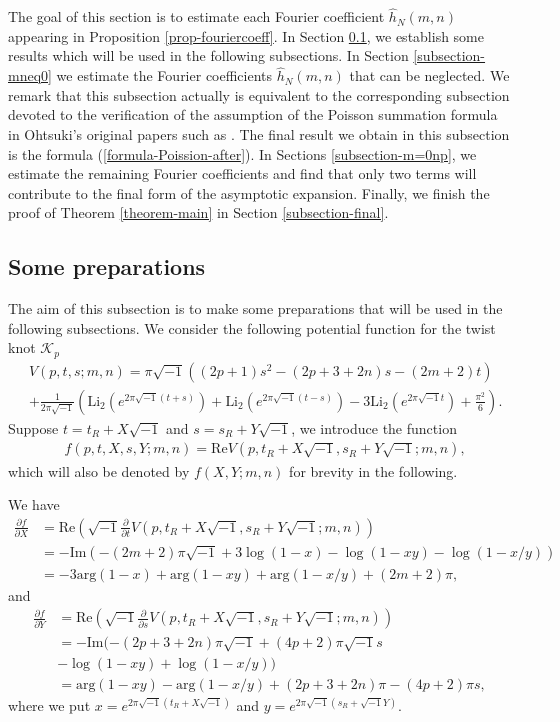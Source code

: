 \documentclass[12pt]{amsart}
\begin{document}
 
The goal of this section is to estimate each Fourier coefficient $\hat{h}_N(m,n)$ appearing in Proposition \ref{prop-fouriercoeff}. In Section \ref{subsection-preparation}, we establish some results which will be used in the following subsections.  In Section \ref{subsection-mneq0} 
we estimate the Fourier coefficients $\hat{h}_N(m,n)$ that can be neglected. We remark that this subsection actually is equivalent to the corresponding subsection devoted to the verification of the assumption of the Poisson summation formula in Ohtsuki's original papers such as \cite{Oht16,Oht18}. The final result we obtain in this subsection is the formula (\ref{formula-Poission-after}). In Sections \ref{subsection-m=0np}, we estimate the remaining Fourier coefficients and find that only two terms will contribute to the final form of the asymptotic expansion. Finally, we finish the proof of Theorem \ref{theorem-main} in Section \ref{subsection-final}.

\subsection{Some preparations} \label{subsection-preparation}
The aim of this subsection is to make some preparations that will be used in the following subsections.  
We consider the following potential function for the twist knot $\mathcal{K}_p$
\begin{align}
    &V(p,t,s; m,n)=\pi \sqrt{-1}\left((2p+1)s^2-(2p+3+2n)s-(2m+2)t\right)\\\nonumber
    &+\frac{1}{2\pi\sqrt{-1}}\left(\text{Li}_2(e^{2\pi\sqrt{-1}(t+s)})+\text{Li}_2(e^{2\pi\sqrt{-1}(t-s)})-3\text{Li}_2(e^{2\pi\sqrt{-1}t})+\frac{\pi^2}{6}\right).
\end{align}
Suppose $t=t_R+X\sqrt{-1}$ and $s=s_R+Y\sqrt{-1}$, we introduce the function
\begin{align}
    &f(p,t,X,s,Y;m,n)=\text{Re} V(p,t_R+X\sqrt{-1},s_R+Y\sqrt{-1};m,n),
\end{align}
which will also be denoted by $f(X,Y;m,n)$ for brevity in the following. 

We have
\begin{align} \label{formula-partialfX}
    \frac{\partial f}{\partial X}&=\text{Re}\left(\sqrt{-1}\frac{\partial }{\partial t}V(p,t_R+X\sqrt{-1},s_R+Y\sqrt{-1};m,n)\right)\\\nonumber
    &=-\text{Im}(-(2m+2)\pi \sqrt{-1}+3\log(1-x)-\log(1-xy)-\log(1-x/y))\\\nonumber
    &=-3\text{arg}(1-x)+\text{arg}(1-xy)+\text{arg}(1-x/y)+(2m+2)\pi,
\end{align}
and
\begin{align}
    \frac{\partial f}{\partial Y}&=\text{Re}\left(\sqrt{-1}\frac{\partial }{\partial s}V(p,t_R+X\sqrt{-1},s_R+Y\sqrt{-1};m,n)\right)\\\nonumber
    &=-\text{Im}(-(2p+3+2n)\pi \sqrt{-1}+(4p+2)\pi\sqrt{-1}s\\\nonumber
    &-\log(1-xy)+\log(1-x/y))\\\nonumber
    &=\text{arg}(1-xy)-\text{arg}(1-x/y)+(2p+3+2n)\pi-(4p+2)\pi s,
\end{align}
where we put $x=e^{2\pi\sqrt{-1}(t_R+X\sqrt{-1})}$ and $y=e^{2\pi\sqrt{-1}(s_R+\sqrt{-1}Y)}$.
\end{document}

